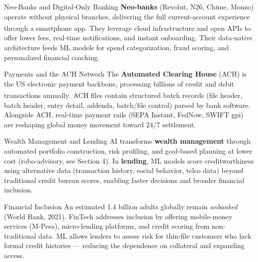 \begin{v3topic}{Neo-Banks and Digital-Only Banking}
    \textbf{Neo-banks} (Revolut, N26, Chime, Monzo) operate without physical branches, delivering the full current-account experience through a smartphone app\textsuperscript{\cite[][p.~5]{kardellBuildFinancialSoftware2025}}.
    They leverage cloud infrastructure and open APIs to offer lower fees, real-time notifications, and instant onboarding.
    Their data-native architecture feeds ML models for spend categorization, fraud scoring, and personalized financial coaching.

\end{v3topic}
\begin{v3topic}{Payments and the ACH Network}
    The \textbf{Automated Clearing House} (ACH) is the US electronic payment backbone, processing billions of credit and debit transactions annually\textsuperscript{\cite[][pp.~5--6]{kardellBuildFinancialSoftware2025}}.
    ACH files contain structured batch records (file header, batch header, entry detail, addenda, batch/file control) parsed by bank software.
    Alongside ACH, real-time payment rails (SEPA Instant, FedNow, SWIFT gpi) are reshaping global money movement toward 24/7 settlement.

\end{v3topic}
\begin{v3topic}{Wealth Management and Lending}
    AI transforms \textbf{wealth management} through automated portfolio construction, risk profiling, and goal-based planning at lower cost (robo-advisory, see Section 4).
    In \textbf{lending}, ML models score creditworthiness using alternative data (transaction history, social behavior, telco data) beyond traditional credit bureau scores, enabling faster decisions and broader financial inclusion.

\end{v3topic}
\begin{v3topic}{Financial Inclusion}
    An estimated 1.4 billion adults globally remain \emph{unbanked} (World Bank, 2021).
    FinTech addresses inclusion by offering mobile-money services (M-Pesa), micro-lending platforms, and credit scoring from non-traditional data.
    ML allows lenders to assess risk for thin-file customers who lack formal credit histories — reducing the dependence on collateral and expanding access.

\end{v3topic}

